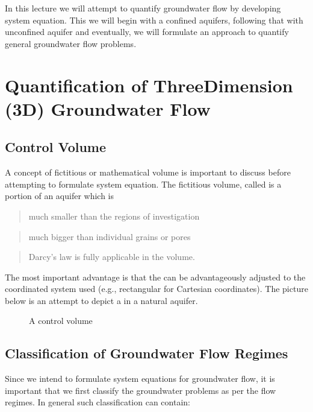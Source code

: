 \documentclass[letterpaper,10pt,english]{jupyterBook}
\begin{document}
\sphinxAtStartPar
In this lecture we will attempt to quantify groundwater flow by developing system equation. This we will begin with a confined aquifers, following that with unconfined aquifer and eventually, we will formulate an approach to quantify general groundwater flow problems.


\section{Quantification of Three\sphinxhyphen{}Dimension (3D) Groundwater Flow}
\label{\detokenize{content/flow/L7/17_quantify_flow:quantification-of-three-dimension-3d-groundwater-flow}}

\subsection{Control Volume}
\label{\detokenize{content/flow/L7/17_quantify_flow:control-volume}}
\sphinxAtStartPar
A concept of fictitious or mathematical volume is important to discuss before attempting to formulate system equation. The fictitious volume, called  is a portion of an aquifer which is
\begin{quote}

\sphinxAtStartPar
much smaller than the regions of investigation
\end{quote}
\begin{quote}

\sphinxAtStartPar
much bigger than individual grains or pores
\end{quote}
\begin{quote}

\sphinxAtStartPar
Darcy’s law is fully applicable in the volume.
\end{quote}

\sphinxAtStartPar
The most important advantage is that the  can be advantageously adjusted to the coordinated system used (e.g., rectangular for Cartesian coordinates). The picture below is an attempt to depict a  in a natural aquifer.

\begin{figure}[htbp]
\centering
\capstart

\noindent{}
\caption{A control volume}\label{\detokenize{content/flow/L7/17_quantify_flow:cv}}\end{figure}


\subsection{Classification of Groundwater Flow Regimes}
\label{\detokenize{content/flow/L7/17_quantify_flow:classification-of-groundwater-flow-regimes}}
\sphinxAtStartPar
Since we intend to formulate system equations for groundwater flow, it is important that we first classify the groundwater problems as per the flow regimes. In general such classification can contain:
\end{document}
